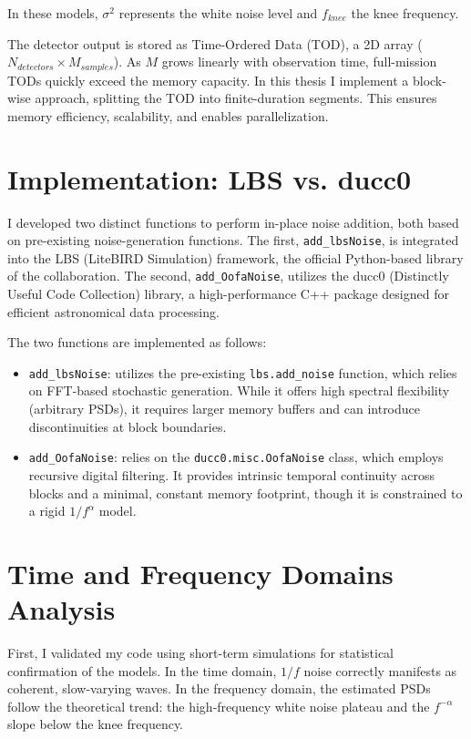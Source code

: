 \documentclass{article}
\begin{document}
In these models, $\sigma^2$ represents the white noise level and $f_{knee}$ the knee frequency.

The detector output is stored as Time-Ordered Data (TOD), a 2D array ($N_{detectors} \times M_{samples}$). As $M$ grows linearly with observation time, full-mission TODs quickly exceed the memory capacity. In this thesis I implement a block-wise approach, splitting the TOD into finite-duration segments. This ensures memory efficiency, scalability, and enables parallelization.



\section*{Implementation: LBS vs. ducc0}
I developed two distinct functions to perform in-place noise addition, both based on pre-existing noise-generation functions. The first, \texttt{add\_lbsNoise}, is integrated into the LBS (LiteBIRD Simulation) framework, the official Python-based library of the collaboration. The second, \texttt{add\_OofaNoise}, utilizes the ducc0 (Distinctly Useful Code Collection) library, a high-performance C++ package designed for efficient astronomical data processing.

The two functions are implemented as follows:
\begin{itemize}
    \item \texttt{add\_lbsNoise}: utilizes the pre-existing \texttt{lbs.add\_noise} function, which relies on FFT-based stochastic generation. While it offers high spectral flexibility (arbitrary PSDs), it requires larger memory buffers and can introduce discontinuities at block boundaries.
    \item \texttt{add\_OofaNoise}: relies on the \texttt{ducc0.misc.OofaNoise} class, which employs recursive digital filtering. It provides intrinsic temporal continuity across blocks and a minimal, constant memory footprint, though it is constrained to a rigid $1/f^\alpha$ model.
\end{itemize}



\section*{Time and Frequency Domains Analysis}
First, I validated my code using short-term simulations for statistical confirmation of the models. In the time domain, $1/f$ noise correctly manifests as coherent, slow-varying waves. In the frequency domain, the estimated PSDs follow the theoretical trend: the high-frequency white noise plateau and the $f^{-\alpha}$ slope below the knee frequency.
\end{document}
